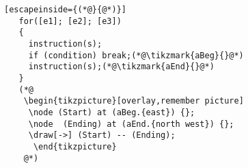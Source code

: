 \documentclass{beamer}
\newcommand{\tikzmark}[2]{%
   \tikz[overlay,remember picture] \node[text=black,
       inner sep=2pt] (#1) {#2};}
\begin{document}
 \begin{frame}[fragile]{}
 \begin{lstlisting}[escapeinside={(*@}{@*)}]
   for([e1]; [e2]; [e3])
   {
     instruction(s);
     if (condition) break;(*@\tikzmark{aBeg}{}@*)
     instruction(s);(*@\tikzmark{aEnd}{}@*)
   }
   (*@
    \begin{tikzpicture}[overlay,remember picture]
     \node (Start) at (aBeg.{east}) {};
     \node  (Ending) at (aEnd.{north west}) {};
     \draw[->] (Start) -- (Ending);
      \end{tikzpicture}
    @*) 
 \end{lstlisting}

\end{frame}
\end{document}
